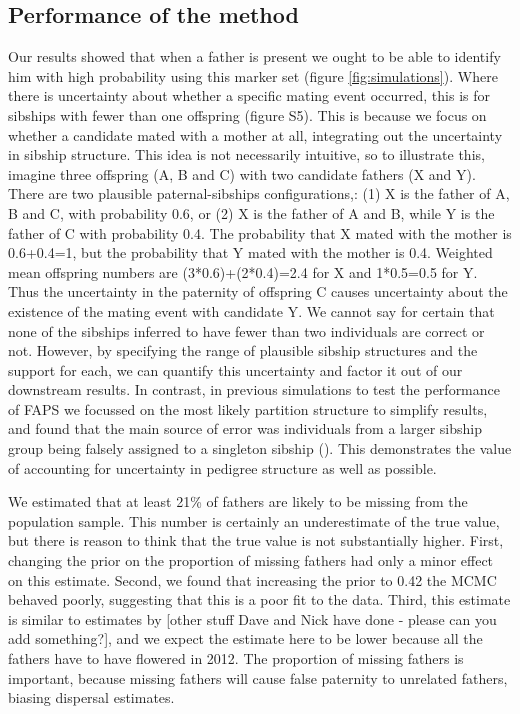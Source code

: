 \documentclass[10pt, a4paper, twocolumn]{article} %
\begin{document}
\subsection{Performance of the method}

Our results showed that when a father is present we ought to be able to identify him with high probability using this marker set (figure \ref{fig:simulations}).
Where there is uncertainty about whether a specific mating event occurred, this is for sibships with fewer than one offspring (figure S5).
This is because we focus on whether a candidate mated with a mother at all, integrating out the uncertainty in sibship structure.
This idea is not necessarily intuitive, so to illustrate this, imagine three offspring (A, B and C) with two candidate fathers (X and Y).
There are two plausible paternal-sibships configurations,: (1) X is the father of A, B and C, with probability 0.6, or (2) X is the father of A and B, while Y is the father of C with probability 0.4.
The probability that X mated with the mother is 0.6+0.4=1, but the probability that Y mated with the mother is 0.4.
Weighted mean offspring numbers are (3*0.6)+(2*0.4)=2.4 for X and 1*0.5=0.5 for Y.
Thus the uncertainty in the paternity of offspring C causes uncertainty about the existence of the mating event with candidate Y.
We cannot say for certain that none of the sibships inferred to have fewer than two individuals are correct or not. 
However, by specifying the range of plausible sibship structures and the support for each, we can quantify this uncertainty and factor it out of our downstream results.
In contrast, in previous simulations to test the performance of FAPS we focussed on the most likely partition structure to simplify results, and found that the main source of error was individuals from a larger sibship group being falsely assigned to a singleton sibship (\cite{ellis2018efficient}).
This demonstrates the value of accounting for uncertainty in pedigree structure as well as possible.

We estimated that at least 21\% of fathers are likely to be missing from the population sample.
This number is certainly an underestimate of the true value, but there is reason to think that the true value is not substantially higher.
First, changing the prior on the proportion of missing fathers had only a minor effect on this estimate.
Second, we found that increasing the prior to 0.42 the MCMC behaved poorly, suggesting that this is a poor fit to the data.
Third, this estimate is similar to estimates by [other stuff Dave and Nick have done - please can you add something?], and we expect the estimate here to be lower because all the fathers have to have flowered in 2012.
The proportion of missing fathers is important, because missing fathers will cause false paternity to unrelated fathers, biasing dispersal estimates.
\end{document}
